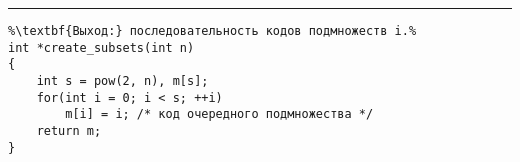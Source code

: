\vspace{5pt} \hrule
\begin{lstlisting}[caption={Генерация всех подмножеств n-элементного множества}, label=p_39, escapechar=\%]
%\noindent\textbf{Вход:} $n \geqslant 0$ - мощность множества.\\%
%\textbf{Выход:} последовательность кодов подмножеств i.%
int *create_subsets(int n)
{
	int s = pow(2, n), m[s];
	for(int i = 0; i < s; ++i)
		m[i] = i; /* код очередного подмножества */
	return m;
}
\end{lstlisting}
